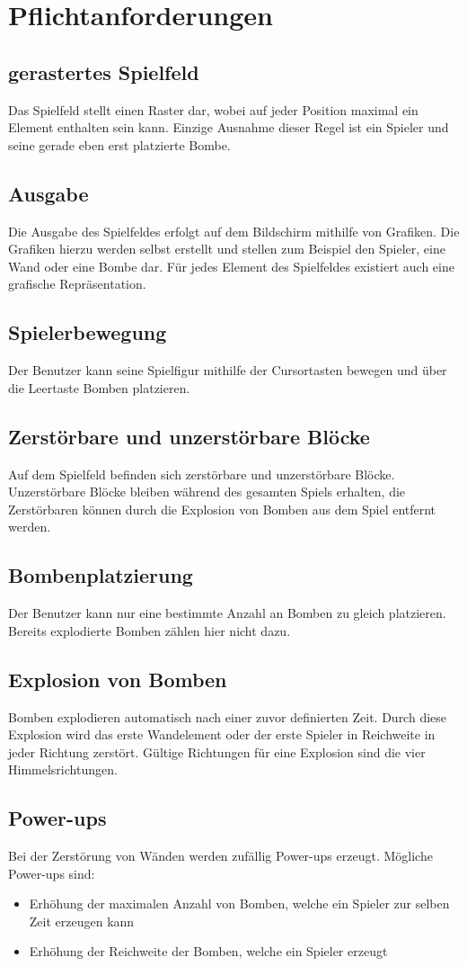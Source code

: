 \documentclass[12pt]{article}
\begin{document}
\section{Pflichtanforderungen}
\subsection{gerastertes Spielfeld}
Das Spielfeld stellt einen Raster dar, wobei auf jeder Position maximal ein Element enthalten sein kann. Einzige Ausnahme dieser Regel ist ein Spieler und seine gerade eben erst platzierte Bombe.
\subsection{Ausgabe}
Die Ausgabe des Spielfeldes erfolgt auf dem Bildschirm mithilfe von Grafiken. Die Grafiken hierzu werden selbst erstellt und stellen zum Beispiel den Spieler, eine Wand oder eine Bombe dar. Für jedes Element des Spielfeldes existiert auch eine grafische Repräsentation.
\subsection{Spielerbewegung}
Der Benutzer kann seine Spielfigur mithilfe der Cursortasten bewegen und über die Leertaste Bomben platzieren.
\subsection{Zerstörbare und unzerstörbare Blöcke}
Auf dem Spielfeld befinden sich zerstörbare und unzerstörbare Blöcke. Unzerstörbare Blöcke bleiben während des gesamten Spiels erhalten, die Zerstörbaren können durch die Explosion von Bomben aus dem Spiel entfernt werden.
\subsection{Bombenplatzierung}
Der Benutzer kann nur eine bestimmte Anzahl an Bomben zu gleich platzieren. Bereits explodierte Bomben zählen hier nicht dazu.
\subsection{Explosion von Bomben}
Bomben explodieren automatisch nach einer zuvor definierten Zeit. Durch diese Explosion wird das erste Wandelement oder der erste Spieler in Reichweite in jeder Richtung zerstört. Gültige Richtungen für eine Explosion sind die vier Himmelsrichtungen.
\subsection{Power-ups}
Bei der Zerstörung von Wänden werden zufällig Power-ups erzeugt. Mögliche Power-ups sind: 
\begin{itemize}
	\item Erhöhung der maximalen Anzahl von Bomben, welche ein Spieler zur selben Zeit erzeugen kann
	\item Erhöhung der Reichweite der Bomben, welche ein Spieler erzeugt
\end{itemize}
\end{document}
